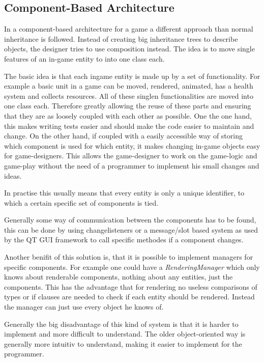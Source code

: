 \subsection{Component-Based Architecture}
In a component-based architecture for a game a different approach than normal inheritance is followed. Instead of
creating big inheritance trees to describe objects, the designer tries to use composition instead. The idea is to move single features of an
in-game entity to into one class each.

The basic idea is that each ingame entity is made up by a set of functionality. For example a basic unit in a game can
be moved, rendered, animated, has a health system and collects resources. All of these singlen functionalities are moved
into one class each. Therefore greatly allowing the reuse of these parts and ensuring that they are as loosely coupled
with each other as possible. One the one hand, this makes writing tests easier and should make the code easier to
maintain and change. On the other hand, if coupled with a easily accessible way of storing which component is used for
which entity, it makes changing in-game objects easy for game-designers. This allows the game-designer to work on the
game-logic and game-play without the need of a programmer to implement his small changes and ideas.

In practise this usually means that every entity is only a unique identifier, to which a certain specific set of
components is tied.

Generally some way of communication between the components has to be found, this can be done by using changelisteners or
a message/slot based system as used by the QT GUI framework to call specific methodes if a component changes.

Another benifit of this solution is, that it is possible to implement managers for specific components. For example one
could have a \textit{RenderingManager} which only knows about renderable components, nothing about any entities, just
the components. This has the advantage that for rendering no useless comparisons of types or if clauses are needed to
check if each entity should be rendered. Instead the manager can just use every object he knows of.

Generally the big disadvantage of this kind of system is that it is harder to implement and more difficult to
understand. The older object-oriented way is generally more intuitiv to understand, making it easier to implement for
the programmer.

